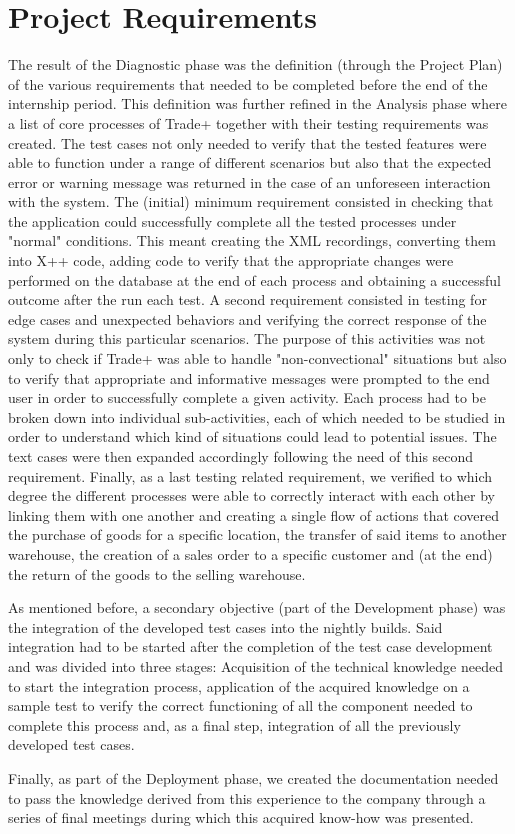 \chapter{Project Requirements}

The result of the Diagnostic phase was the definition (through the Project Plan) of the various requirements that needed to be completed before the end of the internship period. This definition was further refined in the Analysis phase where a list of core processes of Trade+ together with their testing requirements was created. The test cases not only needed to verify that the tested features were able to function under a range of different scenarios but also that the expected error or warning message was returned in the case of an unforeseen interaction with the system. The (initial) minimum  requirement consisted in checking that the application could successfully complete all the tested processes under "normal" conditions. This meant creating the XML recordings, converting them into X++ code, adding code to verify that the appropriate changes were performed on the database at the end of each process and obtaining a successful outcome after the run each test. A second requirement consisted in testing for edge cases and unexpected behaviors and verifying the correct response of the system during this particular scenarios. The purpose of this activities was not only to check if Trade+ was able to handle "non-convectional" situations but also to verify that appropriate and informative messages were prompted to the end user in order to successfully complete a given activity. Each process had to be broken down into individual sub-activities, each of which needed to be studied in order to understand which kind of situations could lead to potential issues. The text cases were then expanded accordingly following the need of this second requirement. Finally, as a last testing related requirement, we verified to which degree the different processes were able to correctly interact with each other by linking them with one another and creating a single flow of actions that covered the purchase of goods for a specific location, the transfer of said items to another warehouse, the creation of a sales order to a specific customer and (at the end) the return of the goods to the selling warehouse.

As mentioned before, a secondary objective (part of the Development phase) was the integration of the developed test cases into the nightly builds. Said integration had to be started after the completion of the test case development and was divided into three stages: Acquisition of the technical knowledge needed to start the integration process, application of the acquired knowledge on a sample test to verify the correct functioning of all the component needed to complete this process and, as a final step, integration of all the previously developed test cases. 

Finally, as part of the Deployment phase, we created the documentation needed to pass the knowledge derived from this experience to the company through a series of final meetings during which this acquired know-how was presented.
